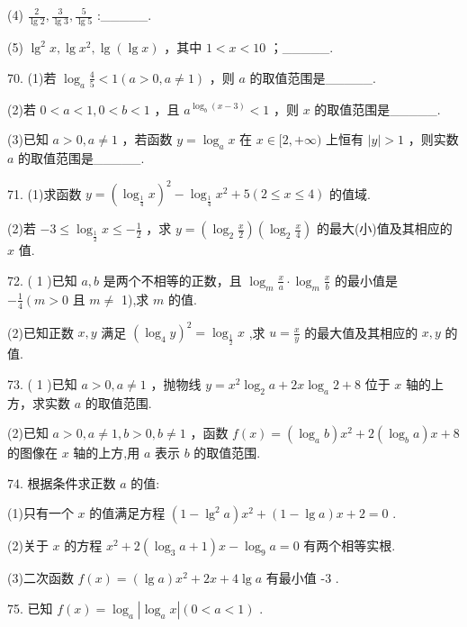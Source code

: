 \documentclass[10pt]{article}
\begin{document}
(4) \(\frac{2}{\lg 2},\frac{3}{\lg 3},\frac{5}{\lg 5}\) :\_\_\_\_\_.

(5) \({\lg }^{2}x,\lg {x}^{2},\lg \left( {\lg x}\right)\) ，其中 \(1 < x < {10}\) ；\_\_\_\_\_.

70. (1)若 \({\log }_{a}\frac{4}{5} < 1\left( {a > 0,a \neq  1}\right)\) ，则 \(a\) 的取值范围是\_\_\_\_\_.

(2)若 \(0 < a < 1,0 < b < 1\) ，且 \({a}^{{\log }_{b}\left( {x - 3}\right) } < 1\) ，则 \(x\) 的取值范围是\_\_\_\_\_.

(3)已知 \(a > 0,a \neq  1\) ，若函数 \(y = {\log }_{a}x\) 在 \(x \in  \lbrack 2, + \infty )\) 上恒有 \(\left| y\right|  > 1\) ，则实数 \(a\) 的取值范围是\_\_\_\_\_.

71. (1)求函数 \(y = {\left( {\log }_{\frac{1}{4}}x\right) }^{2} - {\log }_{\frac{1}{4}}{x}^{2} + 5\left( {2 \leq  x \leq  4}\right)\) 的值域.

(2)若 \(- 3 \leq  {\log }_{\frac{1}{2}}x \leq   - \frac{1}{2}\) ，求 \(y = \left( {{\log }_{2}\frac{x}{2}}\right) \left( {{\log }_{2}\frac{x}{4}}\right)\) 的最大(小)值及其相应的 \(x\) 值.

72. ( 1 )已知 \(a,b\) 是两个不相等的正数，且 \({\log }_{m}\frac{x}{a} \cdot  {\log }_{m}\frac{x}{b}\) 的最小值是 \(- \frac{1}{4}\left( {m > 0}\right.\) 且 \(m \neq\) 1),求 \(m\) 的值.

(2)已知正数 \(x,y\) 满足 \({\left( {\log }_{4}y\right) }^{2} = {\log }_{\frac{1}{2}}x\) ,求 \(u = \frac{x}{y}\) 的最大值及其相应的 \(x,y\) 的值.

73. ( 1 )已知 \(a > 0,a \neq  1\) ，抛物线 \(y = {x}^{2}{\log }_{2}a + {2x}{\log }_{a}2 + 8\) 位于 \(x\) 轴的上方，求实数 \(a\) 的取值范围.

(2)已知 \(a > 0,a \neq  1,b > 0,b \neq  1\) ，函数 \(f\left( x\right)  = \left( {{\log }_{a}b}\right) {x}^{2} + 2\left( {{\log }_{b}a}\right) x + 8\) 的图像在 \(x\) 轴的上方,用 \(a\) 表示 \(b\) 的取值范围.

74. 根据条件求正数 \(a\) 的值:

(1)只有一个 \(x\) 的值满足方程 \(\left( {1 - {\lg }^{2}a}\right) {x}^{2} + \left( {1 - \lg a}\right) x + 2 = 0\) .

(2)关于 \(x\) 的方程 \({x}^{2} + 2\left( {{\log }_{3}a + 1}\right) x - {\log }_{9}a = 0\) 有两个相等实根.

(3)二次函数 \(f\left( x\right)  = \left( {\lg a}\right) {x}^{2} + {2x} + {4\lg }a\) 有最小值 -3 .

75. 已知 \(f\left( x\right)  = {\log }_{a}\left| {{\log }_{a}x}\right| \left( {0 < a < 1}\right)\) .
\end{document}

